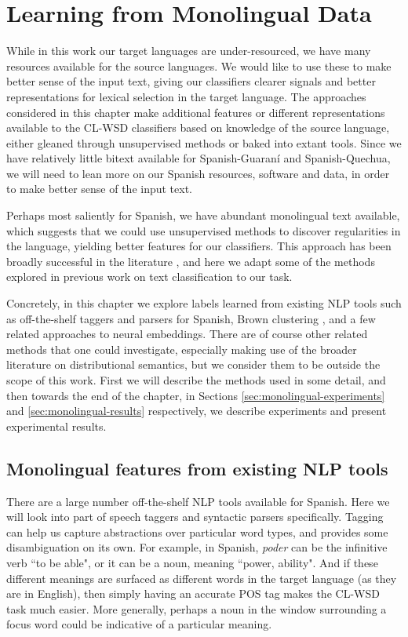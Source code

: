 \chapter{Learning from Monolingual Data}
\label{chap:monolingual}
While in this work our target languages are under-resourced, we have many
resources available for the source languages. We would like to use these to
make better sense of the input text, giving our classifiers clearer signals and
better representations for lexical selection in the target language. The
approaches considered in this chapter make additional features or different
representations available to the CL-WSD classifiers based on knowledge of the
source language, either gleaned through unsupervised methods or baked into
extant tools. Since we have relatively little bitext available for
Spanish-Guaraní and Spanish-Quechua, we will need to lean more on our Spanish
resources, software and data, in order to make better sense of the input text.

Perhaps most saliently for Spanish, we have abundant monolingual text
available, which suggests that we could use unsupervised methods to discover
regularities in the language, yielding better features for our classifiers.
This approach has been broadly successful in the literature
\cite{turian-ratinov-bengio:2010:ACL,baroni2014don}, and here we adapt some of
the methods explored in previous work on text classification to our task.

Concretely, in this chapter we explore labels learned from existing NLP tools
such as off-the-shelf taggers and parsers for Spanish, Brown clustering
\cite{brown1992class}, and a few related approaches to neural embeddings. There
are of course other related methods that one could investigate, especially
making use of the broader literature on distributional semantics, but we
consider them to be outside the scope of this work.
First we will describe the methods used in some
detail, and then towards the end of the chapter, in Sections
\ref{sec:monolingual-experiments} and \ref{sec:monolingual-results}
respectively, we describe experiments and present experimental results.

\section{Monolingual features from existing NLP tools}
There are a large number off-the-shelf NLP tools available for Spanish. Here we
will look into part of speech taggers and syntactic parsers specifically.
Tagging can help us capture abstractions over particular word types, and
provides some disambiguation on its own. For example, in Spanish, \emph{poder}
can be the infinitive verb ``to be able", or it can be a noun, meaning ``power,
ability". And if these different meanings are surfaced as different words in
the target language (as they are in English), then simply having an accurate
POS tag makes the CL-WSD task much easier. More generally, perhaps a noun in
the window surrounding a focus word could be indicative of a particular
meaning.

